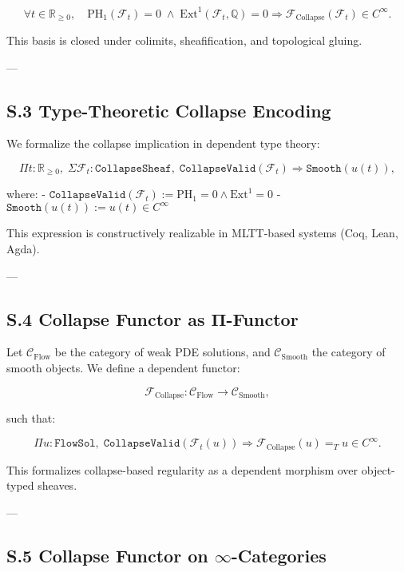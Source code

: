 \documentclass[11pt]{article}
\begin{document}
{\[
\forall t \in \mathbb{R}_{\ge 0},\quad
\mathrm{PH}_1(\mathcal{F}_t) = 0 \;\wedge\; \mathrm{Ext}^1(\mathcal{F}_t, \mathbb{Q}) = 0
\Rightarrow
\mathcal{F}_{\mathrm{Collapse}}(\mathcal{F}_t) \in C^\infty.
\]

This basis is closed under colimits, sheafification, and topological gluing.

---

\subsection*{S.3 Type-Theoretic Collapse Encoding}

We formalize the collapse implication in dependent type theory:

\[
\Pi t : \mathbb{R}_{\ge 0},\;
\Sigma \mathcal{F}_t : \texttt{CollapseSheaf},\;
\texttt{CollapseValid}(\mathcal{F}_t)
\Rightarrow \texttt{Smooth}(u(t)),
\]

where:
- $\texttt{CollapseValid}(\mathcal{F}_t) := \mathrm{PH}_1 = 0 \wedge \mathrm{Ext}^1 = 0$
- $\texttt{Smooth}(u(t)) := u(t) \in C^\infty$

This expression is constructively realizable in MLTT-based systems (Coq, Lean, Agda).

---

\subsection*{S.4 Collapse Functor as Π-Functor}

Let $\mathcal{C}_{\mathrm{Flow}}$ be the category of weak PDE solutions, and $\mathcal{C}_{\mathrm{Smooth}}$ the category of smooth objects.  
We define a dependent functor:

\[
\mathcal{F}_{\mathrm{Collapse}} : \mathcal{C}_{\mathrm{Flow}} \longrightarrow \mathcal{C}_{\mathrm{Smooth}},
\]

such that:

\[
\Pi u : \texttt{FlowSol},\;
\texttt{CollapseValid}(\mathcal{F}_t(u))
\Rightarrow \mathcal{F}_{\mathrm{Collapse}}(u) =_T u \in C^\infty.
\]

This formalizes collapse-based regularity as a dependent morphism over object-typed sheaves.

---

\subsection*{S.5 Collapse Functor on $\infty$-Categories}

}
\end{document}
